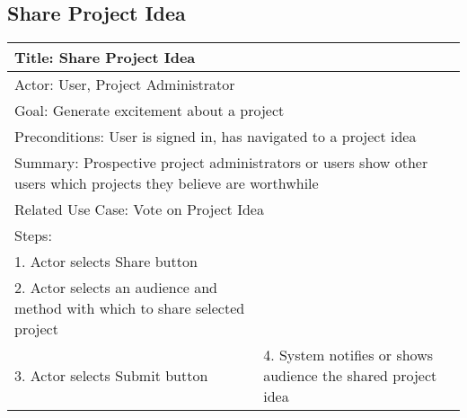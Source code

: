 \documentclass[10pt,a4paper]{article}
\begin{document}
\subsection{Share Project Idea	}
\begin{tabular}{|p{6cm}|p{6cm}|} \hline
\multicolumn{2}{|p{12cm}|}{Title: Share Project Idea	}                                                                                       \\ \hline
\multicolumn{2}{|p{12cm}|}{Actor: User, Project Administrator	}                                                                                                       \\ \hline
\multicolumn{2}{|p{12cm}|}{Goal: Generate excitement about a project		} \\ \hline
\multicolumn{2}{|p{12cm}|}{Preconditions: User is signed in, has navigated to a project idea	}                                                                                               \\ \hline
\multicolumn{2}{|p{12cm}|}{Summary: Prospective project administrators or users show other users which projects they believe are worthwhile		}                           \\ \hline
\multicolumn{2}{|p{12cm}|}{Related Use Case: Vote on Project Idea		}                               \\ \hline
Steps:                                                                              &                                                 \\ \hline
1. Actor selects Share button &                                                 \\ \hline
2. Actor selects an audience and method with which to share selected project     &                                                 \\ \hline
3. Actor selects Submit button&                 
4. System notifies or shows audience the shared project idea \\ \hline


\end{tabular}
\end{document}
